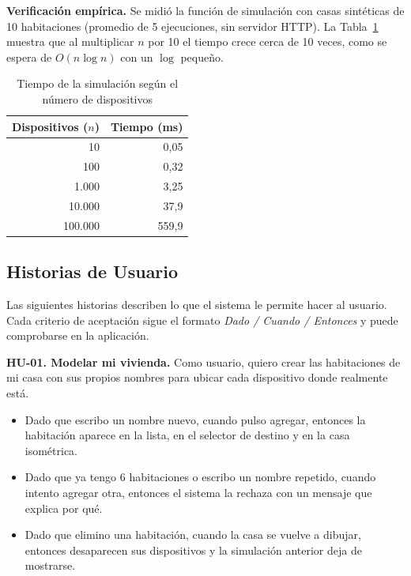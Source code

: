 \documentclass[10pt,journal,compsoc]{IEEEtran}
\begin{document}
\textbf{Verificación empírica.} Se midió la función de simulación con casas sintéticas de 10 habitaciones (promedio de 5 ejecuciones, sin servidor HTTP). La Tabla~\ref{tab:escalado} muestra que al multiplicar $n$ por 10 el tiempo crece cerca de 10 veces, como se espera de $O(n\log n)$ con un $\log$ pequeño.

\begin{table}[H]
\caption{Tiempo de la simulación según el número de dispositivos}
\label{tab:escalado}
\centering
\begin{tabular}{@{}rr@{}}
\toprule
\textbf{Dispositivos ($n$)} & \textbf{Tiempo (ms)} \\
\midrule
10 & 0,05 \\
100 & 0,32 \\
1.000 & 3,25 \\
10.000 & 37,9 \\
100.000 & 559,9 \\
\bottomrule
\end{tabular}
\end{table}

\subsection{Historias de Usuario}
Las siguientes historias describen lo que el sistema le permite hacer al usuario. Cada criterio de aceptación sigue el formato \emph{Dado / Cuando / Entonces} y puede comprobarse en la aplicación.

\textbf{HU-01. Modelar mi vivienda.} Como usuario, quiero crear las habitaciones de mi casa con sus propios nombres para ubicar cada dispositivo donde realmente está.
\begin{itemize}
\item Dado que escribo un nombre nuevo, cuando pulso agregar, entonces la habitación aparece en la lista, en el selector de destino y en la casa isométrica.
\item Dado que ya tengo 6 habitaciones o escribo un nombre repetido, cuando intento agregar otra, entonces el sistema la rechaza con un mensaje que explica por qué.
\item Dado que elimino una habitación, cuando la casa se vuelve a dibujar, entonces desaparecen sus dispositivos y la simulación anterior deja de mostrarse.
\end{itemize}
\end{document}

